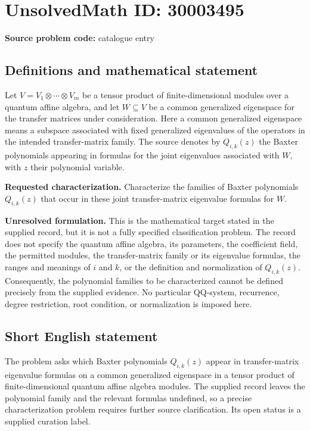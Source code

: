 \documentclass[11pt]{article}
\begin{document}
\section*{UnsolvedMath ID: 30003495}
\textbf{Source problem code:} catalogue entry
\subsection{Definitions and mathematical statement}
Let \(V=V_1\otimes\cdots\otimes V_m\) be a tensor product of finite-dimensional modules over a quantum affine algebra, and let \(W\subseteq V\) be a common generalized eigenspace for the transfer matrices under consideration. Here a common generalized eigenspace means a subspace associated with fixed generalized eigenvalues of the operators in the intended transfer-matrix family. The source denotes by \(Q_{i,k}(z)\) the Baxter polynomials appearing in formulas for the joint eigenvalues associated with \(W\), with \(z\) their polynomial variable.

\textbf{Requested characterization.} Characterize the families of Baxter polynomials \(Q_{i,k}(z)\) that occur in these joint transfer-matrix eigenvalue formulas for \(W\).

\textbf{Unresolved formulation.} This is the mathematical target stated in the supplied record, but it is not a fully specified classification problem. The record does not specify the quantum affine algebra, its parameters, the coefficient field, the permitted modules, the transfer-matrix family or its eigenvalue formulas, the ranges and meanings of \(i\) and \(k\), or the definition and normalization of \(Q_{i,k}(z)\). Consequently, the polynomial families to be characterized cannot be defined precisely from the supplied evidence. No particular QQ-system, recurrence, degree restriction, root condition, or normalization is imposed here.
\subsection{Short English statement}
The problem asks which Baxter polynomials \(Q_{i,k}(z)\) appear in transfer-matrix eigenvalue formulas on a common generalized eigenspace in a tensor product of finite-dimensional quantum affine algebra modules. The supplied record leaves the polynomial family and the relevant formulas undefined, so a precise characterization problem requires further source clarification. Its open status is a supplied curation label.
\end{document}
